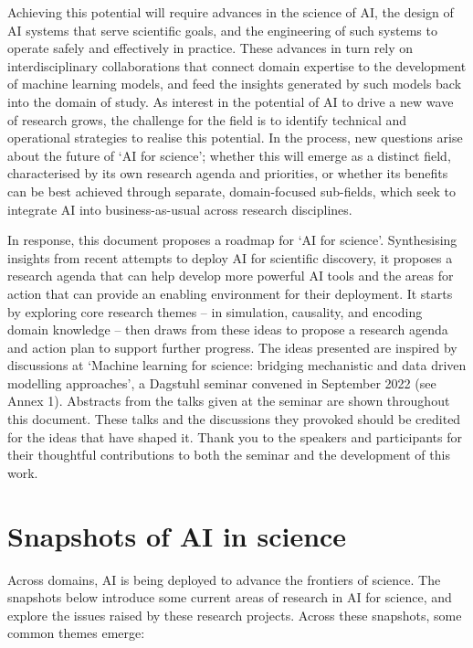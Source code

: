 Achieving this potential will require advances in the science of AI, the
design of AI systems that serve scientific goals, and the engineering of
such systems to operate safely and effectively in practice. These
advances in turn rely on interdisciplinary collaborations that connect
domain expertise to the development of machine learning models, and feed
the insights generated by such models back into the domain of study. As
interest in the potential of AI to drive a new wave of research grows,
the challenge for the field is to identify technical and operational
strategies to realise this potential. In the process, new questions
arise about the future of `AI for science'; whether this will emerge as
a distinct field, characterised by its own research agenda and
priorities, or whether its benefits can be best achieved through
separate, domain-focused sub-fields, which seek to integrate AI into
business-as-usual across research disciplines.

In response, this document proposes a roadmap for `AI for science'.
Synthesising insights from recent attempts to deploy AI for scientific
discovery, it proposes a research agenda that can help develop more
powerful AI tools and the areas for action that can provide an enabling
environment for their deployment. It starts by exploring core research
themes -- in simulation, causality, and encoding domain knowledge --
then draws from these ideas to propose a research agenda and action plan
to support further progress. The ideas presented are inspired by
discussions at `Machine learning for science: bridging mechanistic and
data driven modelling approaches', a Dagstuhl seminar convened in
September 2022 (see Annex 1). Abstracts from the talks given at the
seminar are shown throughout this document. These talks and the
discussions they provoked should be credited for the ideas that have
shaped it. Thank you to the speakers and participants for their
thoughtful contributions to both the seminar and the development of this
work.

\hypertarget{snapshots-of-ai-in-science}{%
\section{Snapshots of AI in science}\label{snapshots-of-ai-in-science}}

Across domains, AI is being deployed to advance the frontiers of
science. The snapshots below introduce some current areas of research in
AI for science, and explore the issues raised by these research
projects. Across these snapshots, some common themes emerge:

